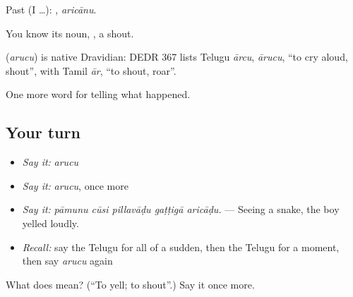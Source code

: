 Past (I …): , \emph{aricānu}.

You know its noun, , a shout.

\begin{cousinweb}
\textbf{} (\emph{arucu}) is native Dravidian: DEDR 367 lists Telugu \emph{ārcu}, \emph{ārucu}, \textquotedblleft{}to cry aloud, shout\textquotedblright{}, with Tamil \emph{ār}, \textquotedblleft{}to shout, roar\textquotedblright{}.
\end{cousinweb}

\begin{grammarlens}[title={What you've built}]
One more word for telling what happened.
\end{grammarlens}

\subsection*{Your turn}
\begin{itemize}
\raggedright
  \item \emph{Say it:} \emph{arucu}
  \item \emph{Say it:} \emph{arucu}, once more
  \item \emph{Say it:} \emph{pāmunu cūsi pillavāḍu gaṭṭigā aricāḍu.} — Seeing a snake, the boy yelled loudly.
  \item \emph{Recall:} say the Telugu for all of a sudden, then the Telugu for a moment, then say \emph{arucu} again
\end{itemize}

\begin{tcolorbox}[breakable,colback=teal!4,colframe=teal!35!black,title={Before you move on}]
What does  mean? (\textquotedblleft{}To yell; to shout\textquotedblright{}.) Say it once more.
\end{tcolorbox}
